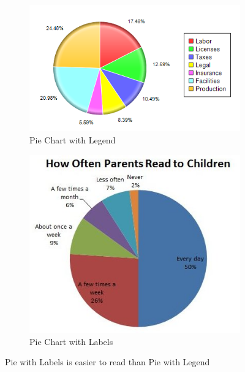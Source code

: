 \documentclass[11pt,fleqn]{book} %
\begin{document}
\begin{example}
\begin{figure}[hibt!]
  \centering
  \begin{subfigure}[c]{0.45\linewidth}
      \includegraphics[width=\linewidth]{Pictures/pie-legend.png}
      \caption{Pie Chart with Legend}
      \label{fig:pie-legend}
  \end{subfigure}
  \begin{subfigure}[c]{0.35\linewidth}
      \includegraphics[width=\linewidth]{Pictures/pie-label.jpg}
      \caption{Pie Chart with Labels}
      \label{fig:pie-label}
  \end{subfigure}
  \caption{Pie with Labels is easier to read than Pie with Legend}
  \label{fig:pie-label-over-legend}
\end{figure}


\end{example}
\end{document}
